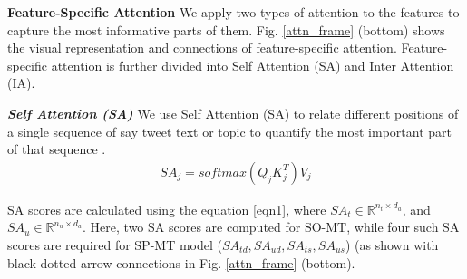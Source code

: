 \documentclass[letterpaper]{article} %
\begin{document}
\par \noindent \textbf{Feature-Specific Attention}\label{mod_section} We apply two types of attention to the features to capture the most informative parts of them. Fig. \ref{attn_frame} (bottom) shows the visual representation and connections of feature-specific attention. Feature-specific attention is further divided into Self Attention (SA) and Inter Attention (IA). %

\par \noindent \textbf{\textit{Self Attention (SA)}} We use Self Attention (SA) to relate different positions of a single sequence of say tweet text or topic to quantify the most important part of that sequence \cite{vaswani2017attention}.  %
\begin{gather}\label{eqn1}
        SA_j = softmax(Q_{j}K^T_{j})V_{j}
\end{gather}
\par \noindent SA scores are calculated using the equation \ref{eqn1}, where $SA_t \in \mathbb{R}^{n_{t} \times d_a} $, and $SA_u \in \mathbb{R}^{n_{u} \times d_a} $. Here, two SA scores are computed for SO-MT, while four such SA scores are required for SP-MT model ($SA_{td}, SA_{ud}, SA_{ts},SA_{us}$) (as shown with black dotted arrow connections in Fig. \ref{attn_frame} (bottom).
\end{document}
